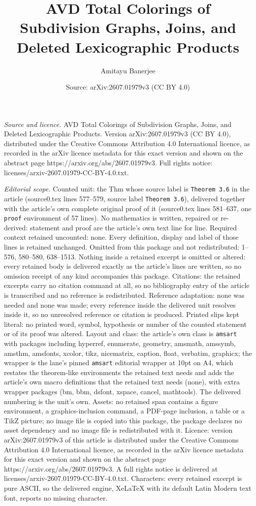 \documentclass[10pt,a4paper]{amsart}
\title[AVD Total Colorings of Subdivision Graphs, Joins, and Delete]{AVD Total Colorings of Subdivision Graphs, Joins, and Deleted Lexicographic Products}
\author{Amitayu Banerjee}
\date{Source: arXiv:2607.01979v3 (CC BY 4.0)}
\begin{document}
\maketitle

\noindent\emph{Source and licence.} AVD Total Colorings of Subdivision Graphs, Joins, and Deleted Lexicographic Products. Version arXiv:2607.01979v3 (CC BY 4.0), distributed under the Creative Commons Attribution 4.0 International licence, as recorded in the arXiv licence metadata for this exact version and shown on the abstract page https://arxiv.org/abs/2607.01979v3. Full rights notice: licenses/arxiv-2607.01979-CC-BY-4.0.txt.\par\smallskip

\noindent\textit{Editorial scope.} Counted unit: the Thm whose source label is \texttt{Theorem 3.6} in the article (source0.tex lines 577--579, source label \texttt{Theorem 3.6}), delivered together with the article's own complete original proof of it (source0.tex lines 581--637, one \texttt{proof} environment of 57 lines). No mathematics is written, repaired or re-derived: statement and proof are the article's own text line for line. Required context retained uncounted: none. Every definition, display and label of those lines is retained unchanged. Omitted from this package and not redistributed: 1--576, 580--580, 638--1513. Nothing inside a retained excerpt is omitted or altered: every retained body is delivered exactly as the article's lines are written, so no omission receipt of any kind accompanies this package. Citations: the retained excerpts carry no citation command at all, so no bibliography entry of the article is transcribed and no reference is redistributed. Reference adaptation: none was needed and none was made; every reference inside the delivered unit resolves inside it, so no unresolved reference or citation is produced. Printed slips kept literal: no printed word, symbol, hypothesis or number of the counted statement or of its proof was altered. Layout and class: the article's own class is \texttt{amsart} with packages including hyperref, enumerate, geometry, amsmath, amssymb, amsthm, amsfonts, xcolor, tikz, nicematrix, caption, float, verbatim, graphicx; the wrapper is the lane's pinned \texttt{amsart} editorial wrapper at 10pt on A4, which restates the theorem-like environments the retained text needs and adds the article's own macro definitions that the retained text needs (none), with extra wrapper packages (bm, bbm, dsfont, xspace, cancel, mathtools). The delivered numbering is the unit's own. Assets: no retained span contains a figure environment, a graphics-inclusion command, a PDF-page inclusion, a table or a TikZ picture; no image file is copied into this package, the package declares no asset dependency and no image file is redistributed with it. Licence: version arXiv:2607.01979v3 of this article is distributed under the Creative Commons Attribution 4.0 International licence, as recorded in the arXiv licence metadata for this exact version and shown on the abstract page https://arxiv.org/abs/2607.01979v3. A full rights notice is delivered at licenses/arxiv-2607.01979-CC-BY-4.0.txt. Characters: every retained excerpt is pure ASCII, so the delivered engine, XeLaTeX with its default Latin Modern text font, reports no missing character.
\end{document}
